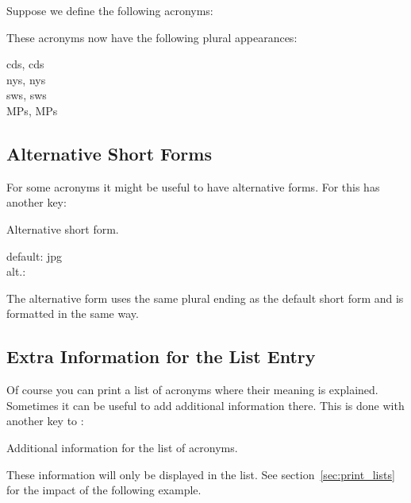 \documentclass[load-preamble+,scrartcl={DIV10}]{cnltx-doc}
\begin{document}
Suppose we define the following acronyms:
\begin{sourcecode}
\end{sourcecode}
These acronyms now have the following plural appearances:
\begin{example}
  \acsp{cd}, \aclp{cd} \\
  \acsp{ny}, \aclp{ny} \\
  \acsp{sw}, \aclp{sw} \\
  \acsp{MP}, \aclp{MP}
\end{example}

\subsection{Alternative Short Forms}
For some acronyms it might be useful to have alternative forms.  For this
 has another key:
\begin{options}
   Alternative short form.
\end{options}
\begin{example}
  default: \acs{jpg} \\
  alt.: 
\end{example}
The alternative form uses the same plural ending as the default short form and
is formatted in the same way.

\subsection{Extra Information for the List Entry}
Of course you can print a list of acronyms where their meaning is explained.
Sometimes it can be useful to add additional information there.  This is done
with another key to :
\begin{options}
    Additional information for the list of acronyms.
\end{options}
These information will only be displayed in the list.  See
section~\ref{sec:print_lists} for the impact of the following example.
\end{document}
